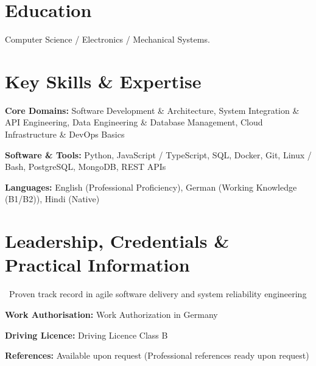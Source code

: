 \documentclass[10pt,a4paper]{article}
\begin{document}
\section*{Education}


{\small Computer Science / Electronics / Mechanical Systems.}\par



\section*{Key Skills \& Expertise}
\textbf{Core Domains:} Software Development \& Architecture, System Integration \& API Engineering, Data Engineering \& Database Management, Cloud Infrastructure \& DevOps Basics\par

\textbf{Software \& Tools:} Python, JavaScript / TypeScript, SQL, Docker, Git, Linux / Bash, PostgreSQL, MongoDB, REST APIs\par
\textbf{Languages:} English (Professional Proficiency), German (Working Knowledge (B1/B2)), Hindi (Native)


\section*{Leadership, Credentials \& Practical Information}

\textbullet\ Proven track record in agile software delivery and system reliability engineering\par

\textbf{Work Authorisation:} Work Authorization in Germany\par

\textbf{Driving Licence:} Driving Licence Class B\par


\textbf{References:} Available upon request (Professional references ready upon request)
\end{document}
